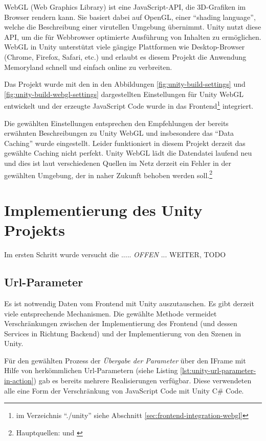 


WebGL (Web Graphics Library) ist eine JavaScript-API, die 3D-Grafiken im Browser rendern kann. Sie basiert dabei auf OpenGL, einer ``shading language'', welche die Beschreibung einer virutellen Umgebung übernimmt. Unity nutzt diese API, um die für Webbrowser optimierte Ausführung von Inhalten zu ermöglichen. WebGL in Unity unterstützt viele gängige Plattformen wie Desktop-Browser (Chrome, Firefox, Safari, etc.) und erlaubt es diesem Projekt die Anwendung Memoryland schnell und einfach online zu verbreiten.


Das Projekt wurde mit den in den Abbildungen \ref{fig:unity-build-settings} und \ref{fig:unity-build-webgl-settings} dargestellten Einstellungen für Unity WebGL entwickelt und der erzeugte JavaScript Code wurde in das Frontend\footnote{im Verzeichnis ``./unity'' siehe Abschnitt \ref{sec:frontend-integration-webgl}} integriert.


Die gewählten Einstellungen entsprechen den Empfehlungen der bereits erwähnten Beschreibungen zu Unity WebGL und insbesondere das ``Data Caching'' wurde eingestellt. Leider funktioniert in diesem Projekt derzeit das gewählte Caching nicht perfekt. Unity WebGL lädt die Datendatei laufend neu und dies ist laut verschiedenen Quellen im Netz derzeit ein Fehler in der gewählten Umgebung, der in naher Zukunft behoben werden soll.\footnote{Hauptquellen: \cite{UnityDocsDataCachingIssue} und \cite{UnityDocsDataCachingIssue2}}


\section{Implementierung des Unity Projekts}

Im ersten Schritt wurde versucht die ..... \emph{OFFEN} ... WEITER, TODO





\subsection{Url-Parameter}
\label{subsec:unity-url-parameter}

Es ist notwendig Daten vom Frontend mit Unity auszutauschen. Es gibt derzeit viele entsprechende Mechanismen. Die gewählte Methode vermeidet Verschränkungen zwischen der Implementierung des Frontend (und dessen Services in Richtung Backend) und der Implementierung von den Szenen in Unity.


Für den gewählten Prozess der \emph{Übergabe der Parameter} über den IFrame mit Hilfe von herkömmlichen Url-Parametern (siehe Listing \ref{lst:unity-url-parameter-in-action}) gab es bereits mehrere Realisierungen verfügbar. Diese verwendeten alle eine Form der Verschränkung von JavaScript Code mit Unity C\# Code. 


